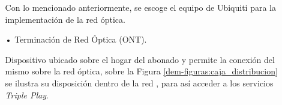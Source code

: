 \begin{enumerate}
\begin{enumerate}
Con lo mencionado anteriormente, se escoge el equipo de Ubiquiti para la implementación de la red  óptica.






\item[•]Terminación de Red Óptica (ONT).

Dispositivo ubicado sobre el hogar del abonado y permite la conexión del mismo sobre la red óptica, sobre la Figura \ref{dem-figuras:caja_distribucion} se ilustra su disposición dentro de la red , para así acceder a los servicios \textit{Triple Play}.
\end{enumerate}



\newpage






\end{enumerate}
